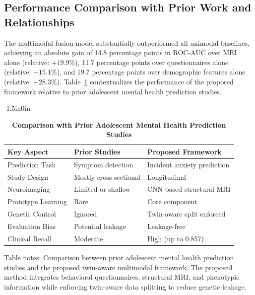 \documentclass[10pt,letterpaper]{article}
\begin{document}
\subsection*{Performance Comparison with Prior Work and Relationships}

The multimodal fusion model substantially outperformed all unimodal baselines, achieving an absolute gain of 14.8 percentage points in ROC-AUC over MRI alone (relative: $+19.9\%$), 11.7 percentage points over questionnaires alone (relative: $+15.1\%$), and 19.7 percentage points over demographic features alone (relative: $+28.3\%$). Table~\ref{tab:prior_comparison} contextualizes the performance of the proposed framework relative to prior adolescent mental health prediction studies.

\begin{table}[!t]
\begin{adjustwidth}{-1.5in}{0in}
\centering
\caption{\textbf{Comparison with Prior Adolescent Mental Health Prediction Studies}}
\label{tab:prior_comparison}
\footnotesize
\renewcommand{\arraystretch}{1.15}

\begin{tabular}{|p{4.5cm}|p{5.2cm}|p{5.2cm}|}
\hline
\textbf{Key Aspect} & \textbf{Prior Studies} & \textbf{Proposed Framework} \\
\hline

Prediction Task & Symptom detection & Incident anxiety prediction \\
\hline

Study Design & Mostly cross-sectional & Longitudinal \\
\hline

Neuroimaging & Limited or shallow & CNN-based structural MRI \\
\hline

Prototype Learning & Rare & Core component \\
\hline

Genetic Control & Ignored & Twin-aware split enforced \\
\hline

Evaluation Bias & Potential leakage & Leakage-free \\
\hline

Clinical Recall & Moderate & High (up to 0.857) \\
\hline

\end{tabular}

\begin{flushleft}
Table notes: Comparison between prior adolescent mental health prediction studies
and the proposed twin-aware multimodal framework. The proposed method integrates
behavioral questionnaires, structural MRI, and phenotypic information while
enforcing twin-aware data splitting to reduce genetic leakage.
\end{flushleft}

\end{adjustwidth}
\end{table}
\end{document}
